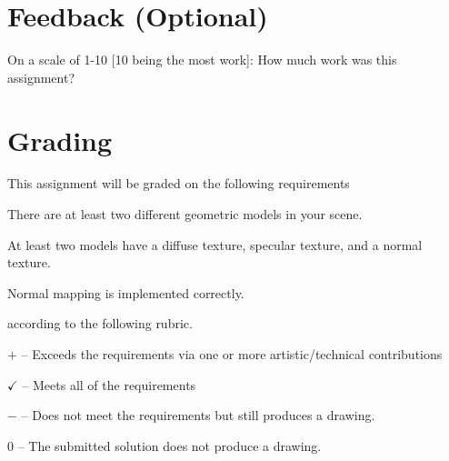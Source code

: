 \documentclass{article}
\begin{document}
\section*{Feedback (Optional)}
\begin{enumerate*}
    \item On a scale of 1-10 [10 being the most work]: How much work was this assignment?
\end{enumerate*}

\section*{Grading}
This assignment will be graded on the following requirements
\begin{itemize*}
    \item There are at least two different geometric models in your scene.
    \item At least two models have a diffuse texture, specular texture, and a normal texture.
    \item Normal mapping is implemented correctly.
\end{itemize*}
according to the following rubric.
\begin{itemize*}
\item $+$ -- Exceeds the requirements via one or more artistic/technical contributions
\item $\checkmark$ -- Meets all of the requirements
\item $-$ -- Does not meet the requirements but still produces a drawing.
\item $0$ -- The submitted solution does not produce a drawing.
\end{itemize*}
\end{document}
